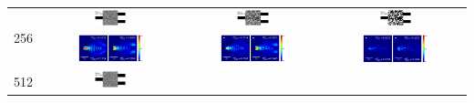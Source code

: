 \begin{landscape}
\begin{table}[ht]
\begin{tabular}{|c|c|c|c|}
    \hline
      \multirow{2}{*}{256} &
      \includegraphics[width=0.24\textwidth]{image/results/wdm/MMA/visualize_eps_cont_256.png} &
      \includegraphics[width=0.24\textwidth]{image/results/wdm/MMA/visualize_eps_disc_256.png} &
      \includegraphics[width=0.24\textwidth]{image/results/wdm/MMA/visualize_eps_fab_256.png} \\
      \cline{2-4}
      &
      \includegraphics[width=0.50\textwidth]{image/results/wdm/MMA/visualize_field_cont_256.png} &
      \includegraphics[width=0.50\textwidth]{image/results/wdm/MMA/visualize_field_disc_256.png} &
      \includegraphics[width=0.50\textwidth]{image/results/wdm/MMA/visualize_field_fab_256.png} \\
    \hline
      \multirow{2}{*}{512} &
      \includegraphics[width=0.24\textwidth]{image/results/wdm/MMA/visualize_eps_cont_512.png} &

\end{tabular}
\end{table}
\end{landscape}
